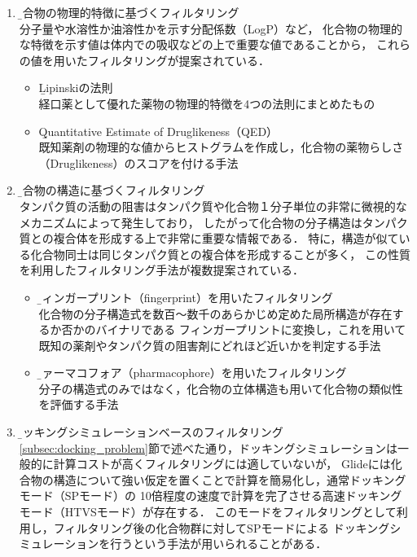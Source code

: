 \begin{enumerate}
\item \b{化合物の物理的特徴に基づくフィルタリング}\\
	分子量や水溶性か油溶性かを示す分配係数（LogP）など，
	化合物の物理的な特徴を示す値は体内での吸収などの上で重要な値であることから，
	これらの値を用いたフィルタリングが提案されている．
	\begin{itemize}
	\item \b{Lipinskiの法則\cite{Lipinski1997}}\\
		経口薬として優れた薬物の物理的特徴を4つの法則にまとめたもの
	\item \b{Quantitative Estimate of Druglikeness（QED）\cite{Bickerton2012}}\\
		既知薬剤の物理的な値からヒストグラムを作成し，化合物の薬物らしさ（Druglikeness）のスコアを付ける手法
	\end{itemize}
\item \b{化合物の構造に基づくフィルタリング}\\
	タンパク質の活動の阻害はタンパク質や化合物１分子単位の非常に微視的なメカニズムによって発生しており，
	したがって化合物の分子構造はタンパク質との複合体を形成する上で非常に重要な情報である．
	特に，構造が似ている化合物同士は同じタンパク質との複合体を形成することが多く，
	この性質を利用したフィルタリング手法が複数提案されている．
	\begin{itemize}
	\item \b{フィンガープリント（fingerprint）を用いたフィルタリング\cite{Nilakantan1993}}\\
		化合物の分子構造式を数百～数千のあらかじめ定めた局所構造が存在するか否かのバイナリである
		フィンガープリントに変換し，これを用いて既知の薬剤やタンパク質の阻害剤にどれほど近いかを判定する手法
	\item \b{ファーマコフォア（pharmacophore）を用いたフィルタリング\cite{Parenti2003}}\\
		分子の構造式のみではなく，化合物の立体構造も用いて化合物の類似性を評価する手法
	\end{itemize}
\item \b{ドッキングシミュレーションベースのフィルタリング}\\
	\ref{subsec:docking_problem}節で述べた通り，ドッキングシミュレーションは一般的に計算コストが高くフィルタリングには適していないが，
	Glideには化合物の構造について強い仮定を置くことで計算を簡易化し，通常ドッキングモード（SPモード）の
	10倍程度の速度\cite{GlideHomePage}で計算を完了させる高速ドッキングモード（HTVSモード）が存在する．
	このモードをフィルタリングとして利用し，フィルタリング後の化合物群に対してSPモードによる
	ドッキングシミュレーションを行うという手法が用いられることがある\cite{Fujimoto2008}．
\end{enumerate}

